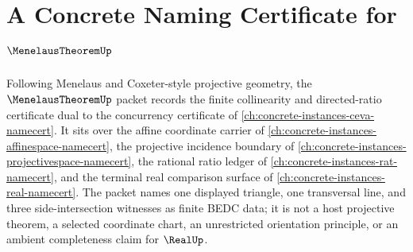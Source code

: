 \chapter{A Concrete Naming Certificate for $\MenelausTheoremUp$}
\label{ch:concrete-instances-menelaus-theorem-namecert}

Following Menelaus and Coxeter-style projective geometry, the $\MenelausTheoremUp$ packet records the finite collinearity and directed-ratio certificate dual to the concurrency certificate of \autoref{ch:concrete-instances-ceva-namecert}. It sits over the affine coordinate carrier of \autoref{ch:concrete-instances-affinespace-namecert}, the projective incidence boundary of \autoref{ch:concrete-instances-projectivespace-namecert}, the rational ratio ledger of \autoref{ch:concrete-instances-rat-namecert}, and the terminal real comparison surface of \autoref{ch:concrete-instances-real-namecert}. The packet names one displayed triangle, one transversal line, and three side-intersection witnesses as finite BEDC data; it is not a host projective theorem, a selected coordinate chart, an unrestricted orientation principle, or an ambient completeness claim for $\RealUp$.

